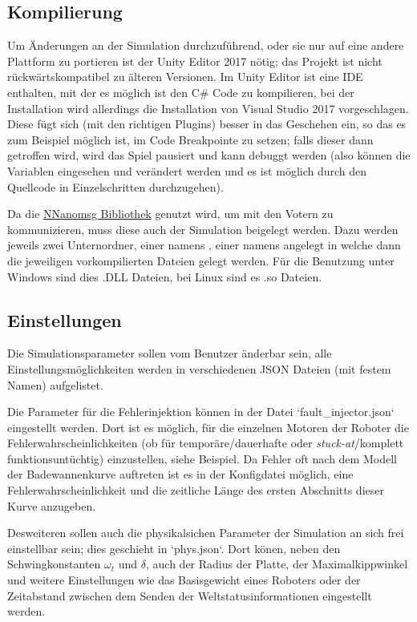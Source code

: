 \documentclass[
    12pt,
    bibliography=totoc,
    ngerman,
    enabledeprecatedfontcommands
]{scrartcl}
\begin{document}
\subsection{Kompilierung}
Um {\"{A}}nderungen an der Simulation durchzuf{\"{u}}hrend, oder sie nur auf eine andere Plattform
zu portieren ist der Unity Editor 2017 n{\"{o}}tig; das Projekt ist nicht r{\"{u}}ckw{\"{a}}rtskompatibel zu {\"{a}}lteren Versionen. Im Unity Editor
ist eine IDE enthalten, mit der es m{\"{o}}glich ist den C\# Code zu kompilieren, bei der Installation wird allerdings die Installation von Visual Studio
2017 vorgeschlagen. Diese f{\"{u}}gt sich (mit den richtigen Plugins) besser in das Geschehen ein, so das es zum Beispiel m{\"{o}}glich ist, im Code
Breakpointe zu setzen; falls dieser dann getroffen wird, wird das Spiel pausiert und kann debuggt werden (also k{\"{o}}nnen die Variablen eingesehen
und ver{\"{a}}ndert werden und es ist m{\"{o}}glich durch den Quellcode in Einzelschritten durchzugehen).

Da die \href{https://github.com/mhowlett/NNanomsg}{NNanomsg Bibliothek} genutzt wird, um mit den Votern zu kommunizieren, muss diese auch der Simulation beigelegt werden. 
Dazu werden jeweils zwei Unternordner, einer namens , einer namens  angelegt in welche dann die jeweiligen vorkompilierten Dateien gelegt werden. F{\"{u}}r die
Benutzung unter Windows sind dies .DLL Dateien, bei Linux sind es .so Dateien.


\subsection{Einstellungen}
Die Simulationsparameter sollen vom Benutzer {\"{a}}nderbar sein, alle Einstellungsm{\"{o}}glichkeiten werden in verschiedenen JSON Dateien (mit festem Namen) aufgelistet.

Die Parameter f{\"{u}}r die Fehlerinjektion k{\"{o}}nnen in der Datei `fault\_injector.json` eingestellt werden. Dort ist es m{\"{o}}glich, f{\"{u}}r die einzelnen Motoren
der Roboter die Fehlerwahrscheinlichkeiten (ob f{\"{u}}r tempor{\"{a}}re/dauerhafte oder \textit{stuck-at}/komplett funktionsunt{\"{u}}chtig) einzustellen, siehe
Beispiel. Da Fehler oft nach dem Modell der Badewannenkurve auftreten ist es in der Konfigdatei m{\"{o}}glich, eine Fehlerwahrscheinlichkeit und die zeitliche L{\"{a}}nge
des ersten Abschnitts dieser Kurve anzugeben.

Desweiteren sollen auch die physikalsichen Parameter der Simulation an sich frei einstellbar sein; dies geschieht in `phys.json`. Dort k{\"{o}}nen, neben den Schwingkonstanten
$\omega_t$ und $\delta$, auch der Radius der Platte, der Maximalkippwinkel und weitere Einstellungen wie das Basisgewicht eines Roboters oder der Zeitabstand zwischen dem
Senden der Weltstatusinformationen eingestellt werden.
\end{document}

